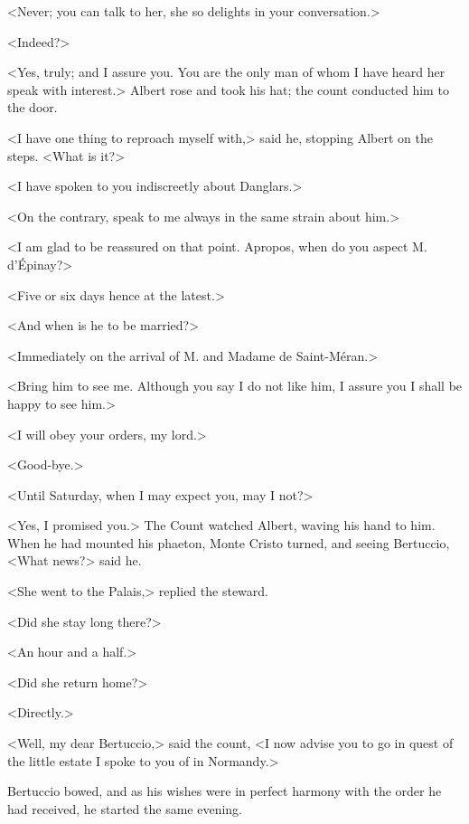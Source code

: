  <Never; you can talk to her, she so delights in your conversation.> 

 <Indeed?>

<Yes, truly; and I assure you. You are the only man of whom I have heard her speak with interest.> Albert rose and took his hat; the count conducted him to the door. 

 <I have one thing to reproach myself with,> said he, stopping Albert on the steps. <What is it?> 

 <I have spoken to you indiscreetly about Danglars.> 

 <On the contrary, speak to me always in the same strain about him.> 

 <I am glad to be reassured on that point. Apropos, when do you aspect M. d'Épinay?> 

 <Five or six days hence at the latest.> 

 <And when is he to be married?> 

 <Immediately on the arrival of M. and Madame de Saint-Méran.> 

 <Bring him to see me. Although you say I do not like him, I assure you I shall be happy to see him.> 

 <I will obey your orders, my lord.> 

 <Good-bye.> 

 <Until Saturday, when I may expect you, may I not?> 

 <Yes, I promised you.> The Count watched Albert, waving his hand to him. When he had mounted his phaeton, Monte Cristo turned, and seeing Bertuccio, <What news?> said he. 

 <She went to the Palais,> replied the steward. 

 <Did she stay long there?> 

 <An hour and a half.> 

 <Did she return home?> 

 <Directly.> 

 <Well, my dear Bertuccio,> said the count, <I now advise you to go in quest of the little estate I spoke to you of in Normandy.> 

 Bertuccio bowed, and as his wishes were in perfect harmony with the order he had received, he started the same evening. 